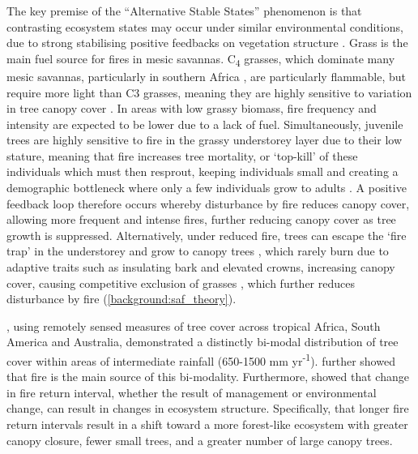 \begin{refsection}
The key premise of the ``Alternative Stable States'' phenomenon is that contrasting ecosystem states may occur under similar environmental conditions, due to strong stabilising positive feedbacks on vegetation structure \citep{Staver2011}. Grass is the main fuel source for fires in mesic savannas. C\textsubscript{4} grasses, which dominate many mesic savannas, particularly in southern Africa \citep{Still2003}, are particularly flammable, but require more light than C3 grasses, meaning they are highly sensitive to variation in tree canopy cover \citep{CharlesDominique2018}. In areas with low grassy biomass, fire frequency and intensity are expected to be lower due to a lack of fuel. Simultaneously, juvenile trees are highly sensitive to fire in the grassy understorey layer due to their low stature, meaning that fire increases tree mortality, or `top-kill' of these individuals which must then resprout, keeping individuals small and creating a demographic bottleneck where only a few individuals grow to adults \citep{Bond1995, Ryan2011}. A positive feedback loop therefore occurs whereby disturbance by fire reduces canopy cover, allowing more frequent and intense fires, further reducing canopy cover as tree growth is suppressed. Alternatively, under reduced fire, trees can escape the `fire trap' in the understorey and grow to canopy trees \citep{Wakeling2011}, which rarely burn due to adaptive traits such as insulating bark and elevated crowns, increasing canopy cover, causing competitive exclusion of grasses \citep{Moustakas2013}, which further reduces disturbance by fire (\autoref{background:saf_theory}). 

\citet{Hirota2011}, using remotely sensed measures of tree cover across tropical Africa, South America and Australia, demonstrated a distinctly bi-modal distribution of tree cover within areas of intermediate rainfall (\textapprox{}650-1500 mm yr\textsuperscript{-1}). \citet{Staver2011} further showed that fire is the main source of this bi-modality. Furthermore, \citet{Staver2017} showed that change in fire return interval, whether the result of management or environmental change, can result in changes in ecosystem structure. Specifically, that longer fire return intervals result in a shift toward a more forest-like ecosystem with greater canopy closure, fewer small trees, and a greater number of large canopy trees.


\end{refsection}
